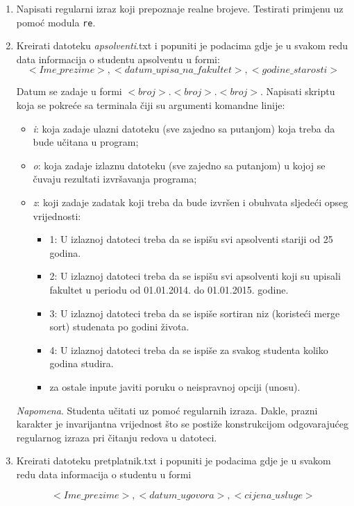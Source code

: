 \begin{enumerate}
	\item Napisati regularni izraz koji prepoznaje realne brojeve. Testirati primjenu uz pomoć modula \texttt{re}.
	
	
	\item Kreirati datoteku \textit{apsolventi}.txt i popuniti je podacima gdje je u svakom redu data
	informacija o studentu apsolventu u formi: 
	 $$<Ime\_prezime>, <datum\_upisa\_na\_fakultet>, <godine\_starosti>$$ 
	
	Datum se zadaje u formi $<broj>.<broj>.<broj>$. Napisati skriptu koja se pokreće sa terminala čiji su argumenti komandne linije:
	\begin{itemize}
		\item  	\textit{i}: koja zadaje ulazni datoteku (sve zajedno sa putanjom) koja treba da bude učitana u
	program;
	     \item \textit{o}: koja zadaje izlaznu datoteku (sve zajedno sa putanjom) u kojoj se čuvaju rezultati	izvršavanja programa;
	     \item  \textit{z}: koji zadaje zadatak koji treba da bude izvršen i obuhvata sljedeći opseg vrijednosti: 
	     \begin{itemize}
	     	\item  1: U izlaznoj datoteci treba da se ispišu svi apsolventi stariji od 25 godina.
             \item 2: U izlaznoj datoteci treba da se ispišu svi apsolventi koji su upisali fakultet u periodu od 01.01.2014. do 01.01.2015. godine.
	         \item 3: U izlaznoj datoteci treba da se ispiše sortiran niz (koristeći merge sort) studenata po godini života.
	         \item 4: U izlaznoj datoteci treba da se ispiše za svakog studenta koliko godina studira.
	        \item za ostale inpute javiti poruku o neispravnoj opciji (unosu).
	         \end{itemize}
       \end{itemize}
	\textit{Napomena}. Studenta učitati uz pomoć regularnih izraza. Dakle, prazni karakter je
	invarijantna vrijednost što se postiže konstrukcijom odgovarajućeg regularnog izraza pri čitanju redova u datoteci.
	
   \item Kreirati datoteku pretplatnik.txt i popuniti je podacima gdje je u svakom redu
   data informacija o studentu u formi
   
   $$<Ime\_prezime>, <datum\_ugovora>, <cijena\_usluge>$$
   

\end{enumerate}
